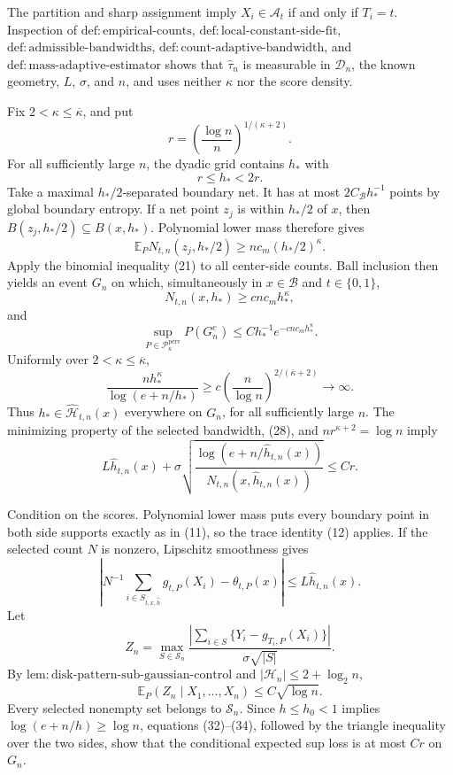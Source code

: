 The partition and sharp assignment imply \(X_i\in\mathcal A_t\) if and only if \(T_i=t\).  Inspection of \(\mathrm{def:empirical\text{-}counts}\), \(\mathrm{def:local\text{-}constant\text{-}side\text{-}fit}\), \(\mathrm{def:admissible\text{-}bandwidths}\), \(\mathrm{def:count\text{-}adaptive\text{-}bandwidth}\), and \(\mathrm{def:mass\text{-}adaptive\text{-}estimator}\) shows that \(\widehat\tau_n\) is measurable in \(\mathcal D_n\), the known geometry, \(L\), \(\sigma\), and \(n\), and uses neither \(\kappa\) nor the score density.

Fix \(2<\kappa\le\overline\kappa\), and put
\[
 r=\left(\frac{\log n}{n}\right)^{1/(\kappa+2)}.
\]
For all sufficiently large \(n\), the dyadic grid contains \(h_*\) with
\[
 r\le h_*<2r. \tag{28}
\]
Take a maximal \(h_*/2\)-separated boundary net.  It has at most \(2C_{\mathcal B}h_*^{-1}\) points by global boundary entropy.  If a net point \(z_j\) is within \(h_*/2\) of \(x\), then \(B(z_j,h_*/2)\subseteq B(x,h_*)\).  Polynomial lower mass therefore gives
\[
 \mathbb E_PN_{t,n}(z_j,h_*/2)\ge nc_m(h_*/2)^{\kappa}. \tag{29}
\]
Apply the binomial inequality (21) to all center-side counts.  Ball inclusion then yields an event \(G_n\) on which, simultaneously in \(x\in\mathcal B\) and \(t\in\{0,1\}\),
\[
 N_{t,n}(x,h_*)\ge c nc_mh_*^{\kappa},
\]
and
\[
 \sup_{P\in\mathcal P_{\kappa}^{\mathrm{perv}}}P(G_n^c)
 \le Ch_*^{-1}e^{-cnc_mh_*^{\kappa}}. \tag{30}
\]
Uniformly over \(2<\kappa\le\overline\kappa\),
\[
 \frac{nh_*^{\kappa}}{\log(e+n/h_*)}
 \ge c\left(\frac n{\log n}\right)^{2/(\overline\kappa+2)}\longrightarrow\infty. \tag{31}
\]
Thus \(h_*\in\widehat{\mathcal H}_{t,n}(x)\) everywhere on \(G_n\), for all sufficiently large \(n\).  The minimizing property of the selected bandwidth, (28), and \(nr^{\kappa+2}=\log n\) imply
\[
 L\widehat h_{t,n}(x)+\sigma\sqrt{\frac{\log(e+n/\widehat h_{t,n}(x))}{N_{t,n}(x,\widehat h_{t,n}(x))}}
 \le Cr. \tag{32}
\]

Condition on the scores.  Polynomial lower mass puts every boundary point in both side supports exactly as in (11), so the trace identity (12) applies.  If the selected count \(N\) is nonzero, Lipschitz smoothness gives
\[
 \left|N^{-1}\sum_{i\in S_{t,x,\widehat h}}g_{t,P}(X_i)-\theta_{t,P}(x)\right|
 \le L\widehat h_{t,n}(x). \tag{33}
\]
Let
\[
 Z_n=\max_{S\in\mathscr S_n}
 \frac{|\sum_{i\in S}\{Y_i-g_{T_i,P}(X_i)\}|}{\sigma\sqrt{|S|}}.
\]
By \(\mathrm{lem:disk\text{-}pattern\text{-}sub\text{-}gaussian\text{-}control}\) and \(|\mathcal H_n|\le2+\log_2n\),
\[
 \mathbb E_P(Z_n\mid X_1,\ldots,X_n)\le C\sqrt{\log n}. \tag{34}
\]
Every selected nonempty set belongs to \(\mathscr S_n\).  Since \(h\le h_0<1\) implies \(\log(e+n/h)\ge\log n\), equations (32)--(34), followed by the triangle inequality over the two sides, show that the conditional expected sup loss is at most \(Cr\) on \(G_n\).

